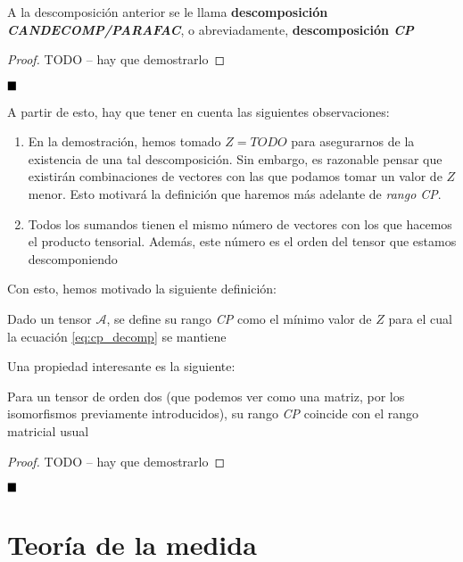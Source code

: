 A la descomposición anterior se le llama \textbf{descomposición \textit{CANDECOMP/PARAFAC}}, o abreviadamente, \textbf{descomposición \textit{CP}}

\begin{proof}

TODO -- hay que demostrarlo

\end{proof}

$\customqed$

A partir de esto, hay que tener en cuenta las siguientes observaciones:

\begin{enumerate}
    \item En la demostración, hemos tomado $Z = TODO$ para asegurarnos de la existencia de una tal descomposición. Sin embargo, es razonable pensar que existirán combinaciones de vectores con las que podamos tomar un valor de $Z$ menor. Esto motivará la definición que haremos más adelante de \textit{rango CP}.
    \item Todos los sumandos tienen el mismo número de vectores con los que hacemos el producto tensorial. Además, este número es el orden del tensor que estamos descomponiendo
\end{enumerate}

Con esto, hemos motivado la siguiente definición:

\begin{definicion}
    Dado un tensor $\mathcal{A}$, se define su rango \textit{CP} como el mínimo valor de $Z$ para el cual la ecuación \eqref{eq:cp_decomp} se mantiene
\end{definicion}

Una propiedad interesante es la siguiente:

\begin{proposicion}[]
    Para un tensor de orden dos (que podemos ver como una matriz, por los isomorfismos previamente introducidos), su rango \textit{CP} coincide con el rango matricial usual
\end{proposicion}

\begin{proof}

TODO -- hay que demostrarlo

\end{proof}

$\customqed$


\newpage
\section{Teoría de la medida}

\endinput

